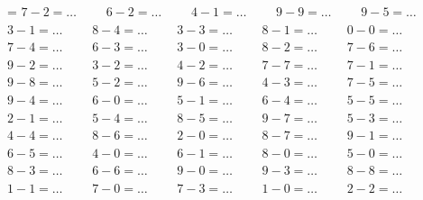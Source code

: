 \pdfpageheight 29.7cm
\pdfpagewidth 21cm
\baselineskip=16pt
\magnification=
\nopagenumbers
\noindent
$ 7 - 2 = \ldots \qquad$
$ 6 - 2 = \ldots \qquad$
$ 4 - 1 = \ldots \qquad$
$ 9 - 9 = \ldots \qquad$
$ 9 - 5 = \ldots \qquad$
$ 3 - 1 = \ldots \qquad$
$ 8 - 4 = \ldots \qquad$
$ 3 - 3 = \ldots \qquad$
$ 8 - 1 = \ldots \qquad$
$ 0 - 0 = \ldots \qquad$
$ 7 - 4 = \ldots \qquad$
$ 6 - 3 = \ldots \qquad$
$ 3 - 0 = \ldots \qquad$
$ 8 - 2 = \ldots \qquad$
$ 7 - 6 = \ldots \qquad$
$ 9 - 2 = \ldots \qquad$
$ 3 - 2 = \ldots \qquad$
$ 4 - 2 = \ldots \qquad$
$ 7 - 7 = \ldots \qquad$
$ 7 - 1 = \ldots \qquad$
$ 9 - 8 = \ldots \qquad$
$ 5 - 2 = \ldots \qquad$
$ 9 - 6 = \ldots \qquad$
$ 4 - 3 = \ldots \qquad$
$ 7 - 5 = \ldots \qquad$
$ 9 - 4 = \ldots \qquad$
$ 6 - 0 = \ldots \qquad$
$ 5 - 1 = \ldots \qquad$
$ 6 - 4 = \ldots \qquad$
$ 5 - 5 = \ldots \qquad$
$ 2 - 1 = \ldots \qquad$
$ 5 - 4 = \ldots \qquad$
$ 8 - 5 = \ldots \qquad$
$ 9 - 7 = \ldots \qquad$
$ 5 - 3 = \ldots \qquad$
$ 4 - 4 = \ldots \qquad$
$ 8 - 6 = \ldots \qquad$
$ 2 - 0 = \ldots \qquad$
$ 8 - 7 = \ldots \qquad$
$ 9 - 1 = \ldots \qquad$
$ 6 - 5 = \ldots \qquad$
$ 4 - 0 = \ldots \qquad$
$ 6 - 1 = \ldots \qquad$
$ 8 - 0 = \ldots \qquad$
$ 5 - 0 = \ldots \qquad$
$ 8 - 3 = \ldots \qquad$
$ 6 - 6 = \ldots \qquad$
$ 9 - 0 = \ldots \qquad$
$ 9 - 3 = \ldots \qquad$
$ 8 - 8 = \ldots \qquad$
$ 1 - 1 = \ldots \qquad$
$ 7 - 0 = \ldots \qquad$
$ 7 - 3 = \ldots \qquad$
$ 1 - 0 = \ldots \qquad$
$ 2 - 2 = \ldots \qquad$



\bye


